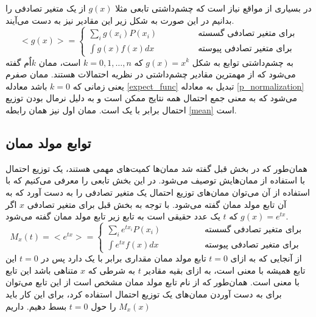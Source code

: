 در بسیاری از مواقع نیاز است که چشم‌داشتی تابعی مثلا $g(x)$ از یک متغیر تصادفی را بدانیم در این صورت به شکل زیر این مقادیر نیز به دست می‌آیند.
\begin{equation}
    <g(x)>=\left\{\begin{array}{ll}{\sum_{i} g(x_{i}) P(x_{i})} & \qquad \qquad {\text{برای متغیر تصادفی گسسته}} \\ 
    {\int g(x)  f(x) d x} & { \qquad \qquad \text {برای متغیر تصادفی پیوسته}}\end{array}\right.
    \label{expect_func}
\end{equation}
به چشم‌داشتی توابع به شکل $g(x) = x^k$ که $k=0,1,\dotsc,n$ است،  ممان $k$اٌم گفته می‌شود که از مهمترین مقادیر چشم‌داشتی در نظریه احتمالات هستند. ممان صفرم یعنی زمانی که $k=0$ باشد معادله \ref{expect_func} تبدیل به معادله \ref{p_normalization} می‌شود که به معنی جمع احتمال همه نتایج ممکن است و به دلیل نرمال بودن توزیع احتمال برابر با یک است. ممان اول نیز همان رابطه \ref{mean} است.  

\subsection{توابع مولد ممان}
همان‌طور که در بخش قبل گفته شد ممان‌ها کمیت‌های مهمی هستند، یک توزیع احتمال با استفاده از ممان‌هایش توصیف می‌شود. در این بخش تابعی را معرفی می‌کنیم که با استفاده از آن می‌توان ممان‌های توزیع احتمال یک متغیر تصادفی را به دست آورد که به آن تابع مولد ممان گفته می‌شود. با توجه به بخش قبل برای متغیر تصادفی $x$ اگر $g(x) = e^{tx}$ که $t$ یک عدد حقیقی است به تابع زیر تابع مولد ممان گفته می‌شود.
\begin{equation}
M_{x}(t)=<e^{t x}>=\left\{\begin{array}{ll}{\sum_{i} e^{t x_{i}} P(x_{i})} & \qquad \qquad {\text { برای متغیر تصادفی گسسته }} \\ 
{\int e^{t x} f(x) d x} & \qquad \qquad {\text { برای متغیر تصادفی پیوسته }}\end{array}\right.
\end{equation}
از آنجایی که به ازای $t=0$ تابع مولد ممان مقداری برابر با یک دارد پس در $t=0$ این تابع همیشه با معنی است، به ازای بقیه مقادیر $t$ به شرطی که $x$ متناهی باشد این تابع با معنی است.
همان‌طور که از نام تابع مولد ممان مشخص است از این تابع می‌توان برای به دست آوردن ممان‌های یک توزیع احتمال استفاده کرد، برای این کار باید $M_{x}(x)$ را حول $t=0$ بسط دهیم. داریم

